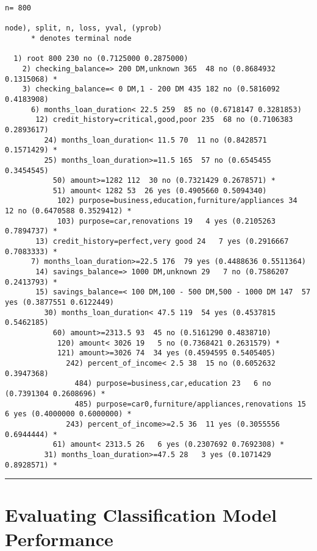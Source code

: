 \documentclass[
]{book}
\begin{document}
\begin{verbatim}
n= 800 

node), split, n, loss, yval, (yprob)
      * denotes terminal node

  1) root 800 230 no (0.7125000 0.2875000)  
    2) checking_balance=> 200 DM,unknown 365  48 no (0.8684932 0.1315068) *
    3) checking_balance=< 0 DM,1 - 200 DM 435 182 no (0.5816092 0.4183908)  
      6) months_loan_duration< 22.5 259  85 no (0.6718147 0.3281853)  
       12) credit_history=critical,good,poor 235  68 no (0.7106383 0.2893617)  
         24) months_loan_duration< 11.5 70  11 no (0.8428571 0.1571429) *
         25) months_loan_duration>=11.5 165  57 no (0.6545455 0.3454545)  
           50) amount>=1282 112  30 no (0.7321429 0.2678571) *
           51) amount< 1282 53  26 yes (0.4905660 0.5094340)  
            102) purpose=business,education,furniture/appliances 34  12 no (0.6470588 0.3529412) *
            103) purpose=car,renovations 19   4 yes (0.2105263 0.7894737) *
       13) credit_history=perfect,very good 24   7 yes (0.2916667 0.7083333) *
      7) months_loan_duration>=22.5 176  79 yes (0.4488636 0.5511364)  
       14) savings_balance=> 1000 DM,unknown 29   7 no (0.7586207 0.2413793) *
       15) savings_balance=< 100 DM,100 - 500 DM,500 - 1000 DM 147  57 yes (0.3877551 0.6122449)  
         30) months_loan_duration< 47.5 119  54 yes (0.4537815 0.5462185)  
           60) amount>=2313.5 93  45 no (0.5161290 0.4838710)  
            120) amount< 3026 19   5 no (0.7368421 0.2631579) *
            121) amount>=3026 74  34 yes (0.4594595 0.5405405)  
              242) percent_of_income< 2.5 38  15 no (0.6052632 0.3947368)  
                484) purpose=business,car,education 23   6 no (0.7391304 0.2608696) *
                485) purpose=car0,furniture/appliances,renovations 15   6 yes (0.4000000 0.6000000) *
              243) percent_of_income>=2.5 36  11 yes (0.3055556 0.6944444) *
           61) amount< 2313.5 26   6 yes (0.2307692 0.7692308) *
         31) months_loan_duration>=47.5 28   3 yes (0.1071429 0.8928571) *
\end{verbatim}

\begin{center}\rule{0.5\linewidth}{0.5pt}\end{center}

\hypertarget{evaluating-classification-model-performance}{%
\section{Evaluating Classification Model Performance}\label{evaluating-classification-model-performance}}
\end{document}
